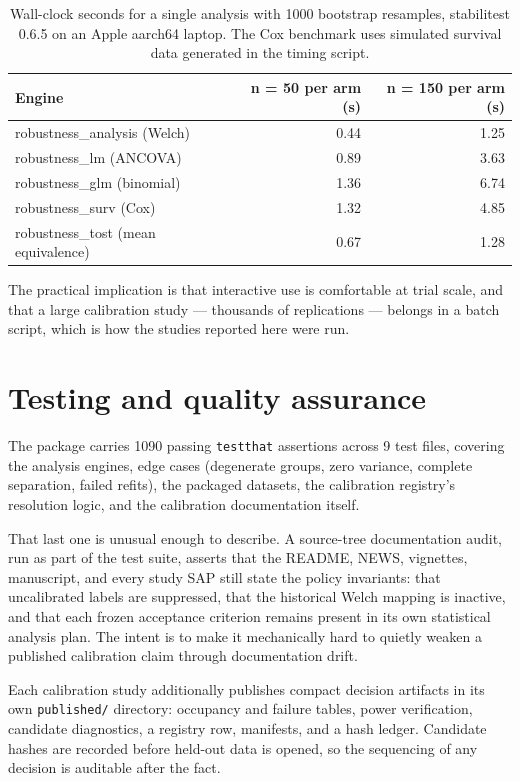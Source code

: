 \begin{longtable}[t]{lrr}
\caption{\label{tab:timingtable}Wall-clock seconds for a single analysis with 1000 bootstrap resamples, stabilitest 0.6.5 on an Apple aarch64 laptop. The Cox benchmark uses simulated survival data generated in the timing script.}\\
\toprule
Engine & n = 50 per arm (s) & n = 150 per arm (s)\\
\midrule
robustness\_analysis (Welch) & 0.44 & 1.25\\
robustness\_lm (ANCOVA) & 0.89 & 3.63\\
robustness\_glm (binomial) & 1.36 & 6.74\\
robustness\_surv (Cox) & 1.32 & 4.85\\
robustness\_tost (mean equivalence) & 0.67 & 1.28\\
\bottomrule
\end{longtable}

The practical implication is that interactive use is comfortable at trial
scale, and that a large calibration study --- thousands of replications ---
belongs in a batch script, which is how the studies reported here were run.

\section{Testing and quality assurance}\label{testing-and-quality-assurance}

The package carries 1090 passing \texttt{testthat} assertions across
9 test files, covering the analysis engines, edge cases (degenerate groups, zero
variance, complete separation, failed refits), the packaged datasets, the
calibration registry's resolution logic, and the calibration documentation
itself.

That last one is unusual enough to describe. A source-tree documentation audit,
run as part of the test suite,
asserts that the README, NEWS, vignettes, manuscript, and every study SAP
still state the policy invariants: that uncalibrated labels are suppressed,
that the historical Welch mapping is inactive, and that each frozen acceptance
criterion remains present in its own statistical analysis plan. The intent is
to make it mechanically hard to quietly weaken a published calibration claim
through documentation drift.

Each calibration study additionally publishes compact decision artifacts in
its own \texttt{published/} directory: occupancy and failure tables, power
verification, candidate diagnostics, a registry row, manifests, and a hash
ledger. Candidate hashes are recorded before held-out data is opened, so
the sequencing of any decision is auditable after the fact.

